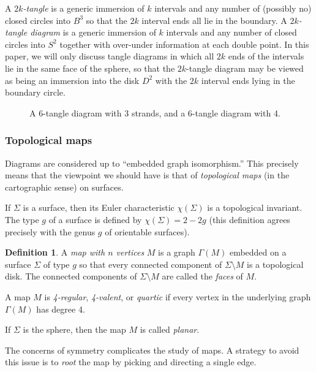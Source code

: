 \documentclass[amsmath,longbibliography,secnumarabic,floatfix,amssymb,nofootinbib,nobibnotes,letterpaper,11pt,tightenlines,notitlepage,showkeys,showlabels]{amsart}%
\newcommand{\ArbSurf}{\Sigma}
\newcommand{\GraphOf}[1]{\Gamma(#1)}
\theoremstyle{definition}
\newtheorem*{definition}{Definition}
\begin{document}
A \emph{$2k$-tangle} is a generic immersion of $k$ intervals and any
number of (possibly no) closed circles into $B^3$ so that the $2k$
interval ends all lie in the boundary. A \emph{$2k$-tangle diagram} is
a generic immersion of $k$ intervals and any number of closed circles
into $S^2$ together with over-under information at each double
point. In this paper, we will only discuss tangle diagrams in which
all $2k$ ends of the intervals lie in the same face of the sphere, so
that the $2k$-tangle diagram may be viewed as being an immersion into
the disk $D^2$ with the $2k$ interval ends lying in the boundary
circle.
\begin{figure}[h!]
  \centering
  \caption{A $6$-tangle diagram with 3 strands, and a $6$-tangle diagram with 4.}
  \label{fig:2ktangle}
\end{figure}

\subsubsection{Topological maps}
\label{sec:topmapdefs}

Diagrams are considered up to ``embedded graph isomorphism.'' This
precisely means that the viewpoint we should have is that of
\emph{topological maps} (in the cartographic sense) on
surfaces.

If $\ArbSurf$ is a surface, then its Euler characteristic
$\chi(\ArbSurf)$ is a topological invariant. The type $g$ of a surface
is defined by $\chi(\ArbSurf) = 2 - 2g$ (this definition agrees
precisely with the genus $g$ of orientable surfaces).

\begin{definition}
  A \emph{map with $n$ vertices} $M$ is a graph $\GraphOf M$ embedded
  on a surface $\ArbSurf$ of type $g$ so that every connected
  component of $\ArbSurf \setminus M$ is a topological disk. The
  connected components of $\ArbSurf \setminus M$ are called the
  \emph{faces} of $M$.

  A map $M$ is \emph{4-regular},
  \emph{4-valent}, or \emph{quartic} if every vertex in the underlying
  graph $\GraphOf M$ has degree 4.

  If $\ArbSurf$ is the sphere, then the map $M$ is called \emph{planar}.
\end{definition}

The concerns of symmetry complicates the study of maps. A strategy to
avoid this issue is to \emph{root} the map by picking and directing a
single edge.
\end{document}
